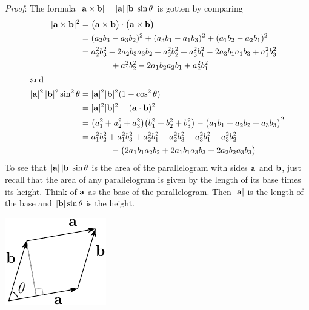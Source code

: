 \begin{enumerate}[(1)]
\textit{Proof}: 
The formula $|\mathbf{a}\times\mathbf{b}|=|\mathbf{a}|\,|\mathbf{b}|\sin\theta$ is gotten by comparing
\begin{align*}
|\mathbf{a}\times\mathbf{b}|^2
&=\big(\mathbf{a}\times\mathbf{b}\big)\cdot\big(\mathbf{a}\times\mathbf{b}\big) \\
&=(a_2b_3-a_3b_2)^2+(a_3b_1-a_1b_3)^2+ (a_1b_2-a_2b_1)^2\\
&=a_2^2b_3^2-2a_2b_3a_3b_2+a_3^2b_2^2
+a_3^2b_1^2-2a_3b_1a_1b_3+a_1^2b_3^2\\&\hskip0.5in
+a_1^2b_2^2-2a_1b_2a_2b_1+a_2^2b_1^2\\
\intertext{and}
|\mathbf{a}|^2\,|\mathbf{b}|^2\sin^2\theta
&=|\mathbf{a}|^2|\mathbf{b}|^2(1-\cos^2\theta)\\
&=|\mathbf{a}|^2|\mathbf{b}|^2-(\mathbf{a}\cdot\mathbf{b})^2 \\
&=\big(a_1^2+a_2^2+a_3^2\big)\big(b_1^2+b_2^2+b_3^2\big)
-\big(a_1b_1+a_2b_2+a_3b_3\big)^2\\
&=a_1^2b_2^2+a_1^2b_3^2+a_2^2b_1^2+a_2^2b_3^2+a_3^2b_1^2+a_3^2b_2^2\\
&\hskip0.5in
 -\big(2a_1b_1a_2b_2+2a_1b_1a_3b_3+2a_2b_2a_3b_3\big)\\
\end{align*}
To see that $|\mathbf{a}|\,|\mathbf{b}|\sin\theta$ is the area of the parallelogram
with sides $\mathbf{a}$ and $\mathbf{b}$, just recall that the area of any parallelogram
is given by the length of its base times its height. Think of $\mathbf{a}$ as the
base of the parallelogram. Then $|\mathbf{a}|$ is the length of the base
and $|\mathbf{b}|\sin\theta$ is the height.
      \begin{efig} 
      \begin{center}
      \includegraphics{areaB.pdf}
      \end{center}
      \end{efig}


\end{enumerate}

